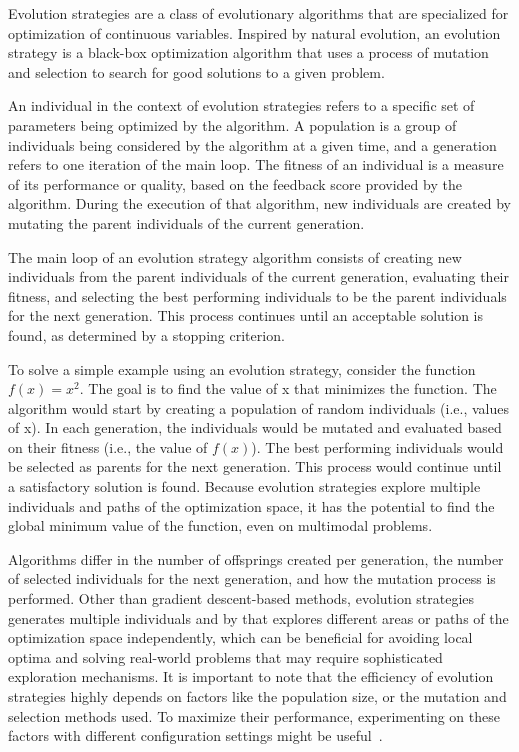 Evolution strategies are a class of evolutionary algorithms that are specialized for optimization of continuous variables. Inspired by natural evolution, an evolution strategy is a black-box optimization algorithm that uses a process of mutation and selection to search for good solutions to a given problem. 

An individual in the context of evolution strategies refers to a specific set of parameters being optimized by the algorithm. A population is a group of individuals being considered by the algorithm at a given time, and a generation refers to one iteration of the main loop. The fitness of an individual is a measure of its performance or quality, based on the feedback score provided by the algorithm. During the execution of that algorithm, new individuals are created by mutating the parent individuals of the current generation.

The main loop of an evolution strategy algorithm consists of creating new individuals from the parent individuals of the current generation, evaluating their fitness, and selecting the best performing individuals to be the parent individuals for the next generation. This process continues until an acceptable solution is found, as determined by a stopping criterion.

To solve a simple example using an evolution strategy, consider the function $f(x) = x^2$. The goal is to find the value of x that minimizes the function. The algorithm would start by creating a population of random individuals (i.e., values of x). In each generation, the individuals would be mutated and evaluated based on their fitness (i.e., the value of $f(x)$). The best performing individuals would be selected as parents for the next generation. This process would continue until a satisfactory solution is found. Because evolution strategies explore multiple individuals and paths of the optimization space, it has the potential to find the global minimum value of the function, even on multimodal problems.

Algorithms differ in the number of offsprings created per generation, the number of selected individuals for the next generation, and how the mutation process is performed. Other than gradient descent-based methods, evolution strategies generates multiple individuals and by that explores different areas or paths of the optimization space independently, which can be beneficial for avoiding local optima and solving real-world problems that may require sophisticated exploration mechanisms. It is important to note that the efficiency of evolution strategies highly depends on factors like the population size, or the mutation and selection methods used. To maximize their performance, experimenting on these factors with different configuration settings might be useful~\cite{salimans_evolution_2017}.

